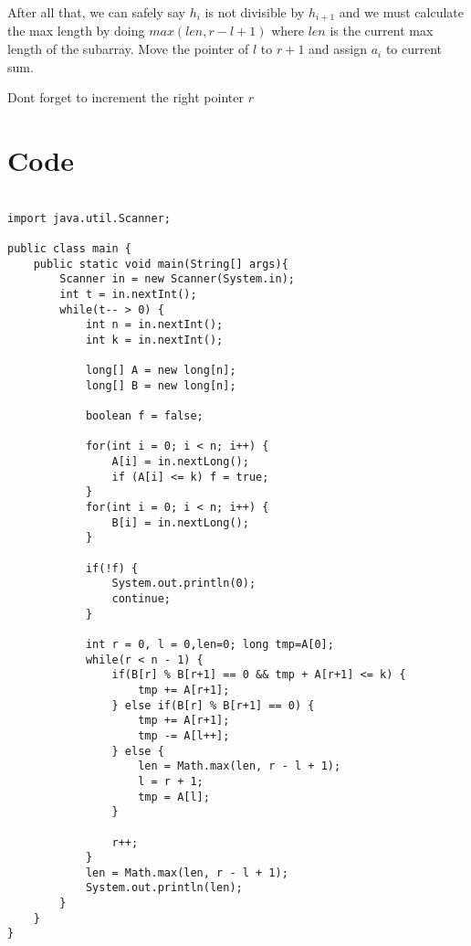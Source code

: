 \documentclass{article}
\begin{document}
After all that, we can safely say $h_i$ is not divisible by $h_{i+1}$ and we must calculate the max length by doing $max(len, r - l + 1)$ where $len$ is the current max length of the subarray. Move the pointer of $l$ to $r + 1$ and assign $a_i$ to current sum.

Dont forget to increment the right pointer $r$


\newpage
\section{Code}

\begin{lstlisting}

import java.util.Scanner;

public class main {
    public static void main(String[] args){ 
        Scanner in = new Scanner(System.in);
        int t = in.nextInt();
        while(t-- > 0) {
            int n = in.nextInt();
            int k = in.nextInt();

            long[] A = new long[n];
            long[] B = new long[n];

            boolean f = false;

            for(int i = 0; i < n; i++) {
                A[i] = in.nextLong();
                if (A[i] <= k) f = true;
            }
            for(int i = 0; i < n; i++) {
                B[i] = in.nextLong();
            }

            if(!f) {
                System.out.println(0);
                continue;
            }

            int r = 0, l = 0,len=0; long tmp=A[0];
            while(r < n - 1) {
                if(B[r] % B[r+1] == 0 && tmp + A[r+1] <= k) {
                    tmp += A[r+1];
                } else if(B[r] % B[r+1] == 0) {
                    tmp += A[r+1];
                    tmp -= A[l++];
                } else {
                    len = Math.max(len, r - l + 1);
                    l = r + 1;  
                    tmp = A[l];
                }

                r++;
            }
            len = Math.max(len, r - l + 1);
            System.out.println(len);
        }
    }
}

\end{lstlisting}
\end{document}
